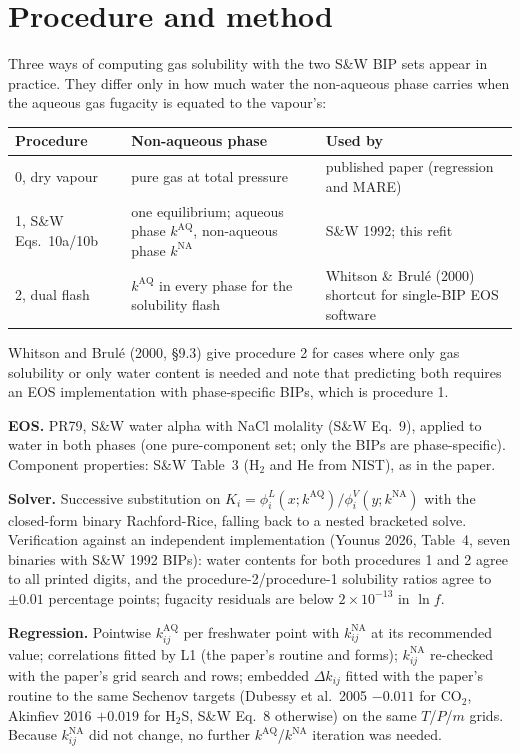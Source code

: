 \documentclass[10pt,a4paper]{article}
\begin{document}
\section{Procedure and method}

Three ways of computing gas solubility with the two S\&W BIP sets appear in practice. They differ only in how much water the non-aqueous phase carries when the aqueous gas fugacity is equated to the vapour's:

\begin{center}
\begin{tabular}{p{38mm}p{62mm}p{52mm}}
\toprule
Procedure & Non-aqueous phase & Used by \\
\midrule
0, dry vapour & pure gas at total pressure & published paper (regression and MARE) \\
1, S\&W Eqs.~10a/10b & one equilibrium; aqueous phase $k^{\mathrm{AQ}}$, non-aqueous phase $k^{\mathrm{NA}}$ & S\&W 1992; this refit \\
2, dual flash & $k^{\mathrm{AQ}}$ in every phase for the solubility flash & Whitson \& Brulé (2000) shortcut for single-BIP EOS software \\
\bottomrule
\end{tabular}
\end{center}

Whitson and Brulé (2000, \S9.3) give procedure 2 for cases where only gas solubility or only water content is needed and note that predicting both requires an EOS implementation with phase-specific BIPs, which is procedure 1.

\textbf{EOS.} PR79, S\&W water alpha with NaCl molality (S\&W Eq.~9), applied to water in both phases (one pure-component set; only the BIPs are phase-specific). Component properties: S\&W Table~3 (H$_2$ and He from NIST), as in the paper.

\textbf{Solver.} Successive substitution on $K_i = \phi_i^{L}(x; k^{\mathrm{AQ}})/\phi_i^{V}(y; k^{\mathrm{NA}})$ with the closed-form binary Rachford-Rice, falling back to a nested bracketed solve. Verification against an independent implementation (Younus 2026, Table~4, seven binaries with S\&W 1992 BIPs): water contents for both procedures 1 and 2 agree to all printed digits, and the procedure-2/procedure-1 solubility ratios agree to $\pm0.01$ percentage points; fugacity residuals are below $2\times10^{-13}$ in $\ln f$.

\textbf{Regression.} Pointwise $k_{ij}^{\mathrm{AQ}}$ per freshwater point with $k_{ij}^{\mathrm{NA}}$ at its recommended value; correlations fitted by L1 (the paper's routine and forms); $k_{ij}^{\mathrm{NA}}$ re-checked with the paper's grid search and rows; embedded $\Delta k_{ij}$ fitted with the paper's routine to the same Sechenov targets (Dubessy et al.\ 2005 $-0.011$ for CO$_2$, Akinfiev 2016 $+0.019$ for H$_2$S, S\&W Eq.~8 otherwise) on the same $T$/$P$/$m$ grids. Because $k_{ij}^{\mathrm{NA}}$ did not change, no further $k^{\mathrm{AQ}}$/$k^{\mathrm{NA}}$ iteration was needed.
\end{document}
